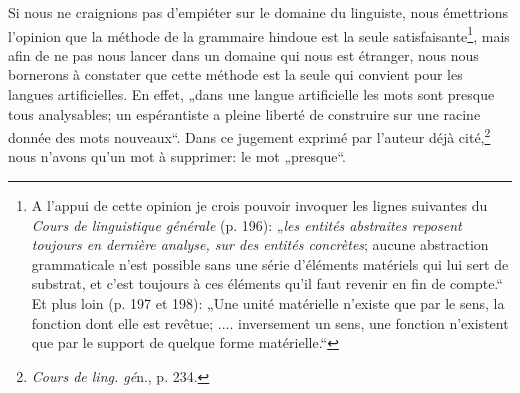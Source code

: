 {    Si nous ne craignions pas d’empiéter sur le domaine du linguiste,
    nous émettrions l’opinion que la méthode de la grammaire hindoue
    est la seule satisfaisante\footnote{A l’appui de cette opinion je
      crois pouvoir invoquer les lignes suivantes du \emph{Cours de
        linguistique générale} (p. 196): „\emph{les entités
        abstraites reposent toujours en dernière analyse, sur des
        entités concrètes}; aucune abstraction grammaticale n’est
      possible sans une série d’éléments matériels qui lui sert de
      substrat, et c’est toujours à ces éléments qu’il faut revenir en
      fin de compte.“  Et plus loin (p. 197 et 198): „Une unité
      matérielle n’existe que par le sens, la fonction dont elle est
      revêtue; ....  inversement un sens, une fonction n’existent que
      par le support de quelque forme matérielle.“}, mais afin de ne
    pas nous lancer dans un domaine qui nous est étranger, nous nous
    bornerons à constater que cette méthode est la seule qui convient
    pour les langues artificielles. En effet, „dans une langue
    artificielle les mots sont presque tous analysables; un
    espérantiste a pleine liberté de construire sur une racine donnée
    des mots nouveaux“. Dans ce jugement exprimé par l’auteur déjà
    cité,\footnote{\emph{Cours de ling. gé}n., p. 234.}  nous n’avons
    qu’un mot à supprimer: le mot „presque“.
  }
  
